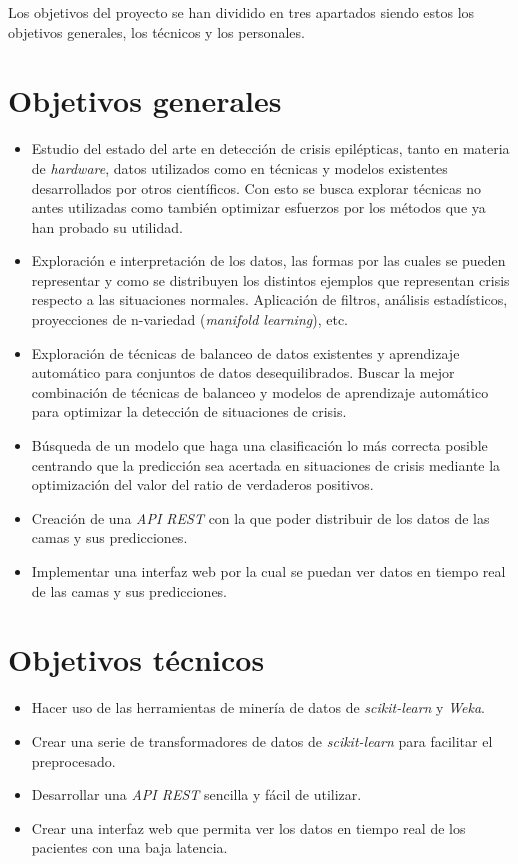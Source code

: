 
Los objetivos del proyecto se han dividido en tres apartados siendo estos los objetivos generales, los técnicos y los personales.

\section{Objetivos generales}

\begin{itemize}
	\item Estudio del estado del arte en detección de crisis epilépticas, tanto en materia de \textit{hardware}, datos utilizados como en técnicas y modelos existentes desarrollados por otros científicos. Con esto se busca explorar técnicas no antes utilizadas como también optimizar esfuerzos por los métodos que ya han probado su utilidad.
	\item Exploración e interpretación de los datos, las formas por las cuales se pueden representar y como se distribuyen los distintos ejemplos que representan crisis respecto a las situaciones normales. Aplicación de filtros, análisis estadísticos, proyecciones de n-variedad (\textit{manifold learning}), etc.
	\item Exploración de técnicas de balanceo de datos existentes y aprendizaje automático para conjuntos de datos desequilibrados. Buscar la mejor combinación de técnicas de balanceo y modelos de aprendizaje automático para optimizar la detección de situaciones de crisis.
	\item Búsqueda de un modelo que haga una clasificación lo más correcta posible centrando que la predicción sea acertada en situaciones de crisis mediante la optimización del valor del ratio de verdaderos positivos.
	\item Creación de una \textit{API REST} con la que poder distribuir de los datos de las camas y sus predicciones.
	\item Implementar una interfaz web por la cual se puedan ver datos en tiempo real de las camas y sus predicciones.
\end{itemize}

\section{Objetivos técnicos}

\begin{itemize}
	\item Hacer uso de las herramientas de minería de datos de \textit{scikit-learn} y \textit{Weka}.
	\item Crear una serie de transformadores de datos de \textit{scikit-learn} para facilitar el preprocesado.
	\item Desarrollar una \textit{API REST} sencilla y fácil de utilizar.
	\item Crear una interfaz web que permita ver los datos en tiempo real de los pacientes con una baja latencia.
\end{itemize}

